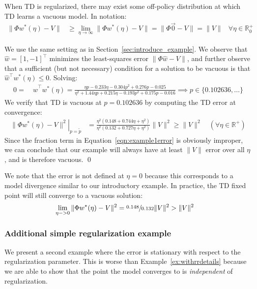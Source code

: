 \begin{example}
  \label{ex:withrrdetails}
  When TD is regularized, there may exist some off-policy distribution at which TD learns a vacuous model. In notation:
  \begin{align}
    \|\Phi w^*(\eta) - V\| & \geq \lim_{\eta\to\infty} \|\Phi w^*(\eta) - V \| = \|\Phi \vec 0 - V \| = \|V \| & \forall \eta\in\mathbb{R}_0^+
  \end{align}

  \proof We use the same setting as in Section~\ref{sec:introduce_example}.
  We observe that $\hat w = [1, -1]^\top$ minimizes the least-squares error $\|\Phi \hat w - V\|$, and further observe that a sufficient (but not necessary) condition for a solution to be vacuous is that $\hat w^\top w^*(\eta) \leq 0$. Solving:
  \begin{align}
    0= & ~ \hat w^\top w^*(\eta) =
    \frac{\eta p-0.233 \eta-0.304 p^2+0.276 p-0.025}{\eta^2+1.44 \eta p+0.215 \eta-0.193 p^2+0.175 p-0.016}
    \implies p \in \{0.102636, \ldots\}
  \end{align}
  We verify that TD is vacuous at $p=0.102636$ by computing the TD error at convergence:
  \begin{align}
    \left. \|\Phi w^*(\eta) - V\|^2 \right|_{p=\tilde p} & =
    \frac{\eta^2 (0.148 + 0.744 \eta + \eta^2)}{ \eta^2 (0.132 + 0.727 \eta + \eta^2)} \|V\|^2 \geq \|V\|^2\quad(\forall \eta \in \mathbb R^+) \label{eqn:example1error}
  \end{align}
  Since the fraction term in Equation~\ref{eqn:example1error} is obviously improper, we can conclude that our example will always have at least $\|V\|$ error over all $\eta$, and is therefore vacuous. \qed
\end{example}
We note that the error is not defined at $\eta=0$ because this corresponds to a model divergence similar to our introductory example. In practice, the TD fixed point will still converge to a vacuous solution:
\begin{align}
  \lim_{\eta->0} \|\Phi w^*(\eta) - V\|^2 & = \sfrac{0.148}{0.132} \|V\|^2 > \|V\|^2
\end{align}


\subsubsection{Additional simple regularization example}
\label{sec:withrr2}

We present a second example where the error is stationary with respect to the regularization parameter. This is worse than Example~\ref{ex:withrrdetails} because we are able to show that the point the model converges to is \emph{independent} of regularization.

